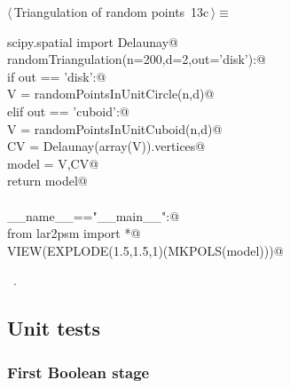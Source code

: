 \documentclass[11pt,oneside]{article}	%
\begin{document}
\begin{flushleft} \small \label{scrap21}
\protect{}$\langle\,$Triangulation of random points\nobreak\ {\footnotesize 13c}$\,\rangle\equiv$
\vspace{-1ex}
\begin{list}{}{} \item
\mbox{}\verb@from scipy.spatial import Delaunay@\\
\mbox{}\verb@def randomTriangulation(n=200,d=2,out='disk'):@\\
\mbox{}\verb@   if out == 'disk':@\\
\mbox{}\verb@      V = randomPointsInUnitCircle(n,d)@\\
\mbox{}\verb@   elif out == 'cuboid':@\\
\mbox{}\verb@      V = randomPointsInUnitCuboid(n,d)@\\
\mbox{}\verb@   CV = Delaunay(array(V)).vertices@\\
\mbox{}\verb@   model = V,CV@\\
\mbox{}\verb@   return model@\\
\mbox{}\verb@@\\
\mbox{}\verb@if __name__=="__main__":@\\
\mbox{}\verb@   from lar2psm import *@\\
\mbox{}\verb@   VIEW(EXPLODE(1.5,1.5,1)(MKPOLS(model)))@\\
\mbox{}\verb@@{\NWsep}
\end{list}
\vspace{-1ex}
\footnotesize\addtolength{\baselineskip}{-1ex}
\begin{list}{}{\setlength{\itemsep}{-\parsep}\setlength{\itemindent}{-\leftmargin}}
\item \NWtxtMacroRefIn\ .
\end{list}
\end{flushleft}
\subsection{Unit tests}

\subsubsection{First Boolean stage}
\end{document}
